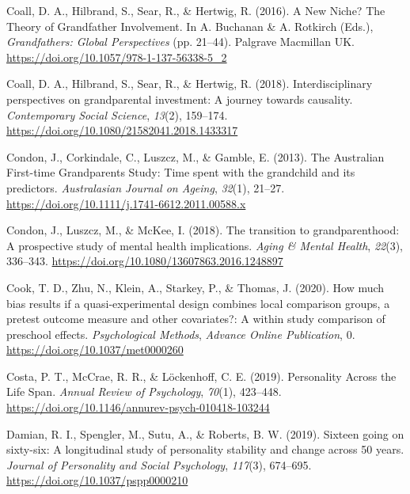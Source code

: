 \documentclass[
  english,
  man, noextraspace]{apa7}
\begin{document}
\leavevmode\hypertarget{ref-coallNewNicheTheory2016}{}%
Coall, D. A., Hilbrand, S., Sear, R., \& Hertwig, R. (2016). A New Niche? The Theory of Grandfather Involvement. In A. Buchanan \& A. Rotkirch (Eds.), \emph{Grandfathers: Global Perspectives} (pp. 21--44). Palgrave Macmillan UK. \url{https://doi.org/10.1057/978-1-137-56338-5_2}

\leavevmode\hypertarget{ref-coallInterdisciplinaryPerspectivesGrandparental2018}{}%
Coall, D. A., Hilbrand, S., Sear, R., \& Hertwig, R. (2018). Interdisciplinary perspectives on grandparental investment: A journey towards causality. \emph{Contemporary Social Science}, \emph{13}(2), 159--174. \url{https://doi.org/10.1080/21582041.2018.1433317}

\leavevmode\hypertarget{ref-condonAustralianFirsttimeGrandparents2013}{}%
Condon, J., Corkindale, C., Luszcz, M., \& Gamble, E. (2013). The Australian First-time Grandparents Study: Time spent with the grandchild and its predictors. \emph{Australasian Journal on Ageing}, \emph{32}(1), 21--27. \url{https://doi.org/10.1111/j.1741-6612.2011.00588.x}

\leavevmode\hypertarget{ref-condonTransitionGrandparenthoodProspective2018}{}%
Condon, J., Luszcz, M., \& McKee, I. (2018). The transition to grandparenthood: A prospective study of mental health implications. \emph{Aging \& Mental Health}, \emph{22}(3), 336--343. \url{https://doi.org/10.1080/13607863.2016.1248897}

\leavevmode\hypertarget{ref-cookHowMuchBias2020}{}%
Cook, T. D., Zhu, N., Klein, A., Starkey, P., \& Thomas, J. (2020). How much bias results if a quasi-experimental design combines local comparison groups, a pretest outcome measure and other covariates?: A within study comparison of preschool effects. \emph{Psychological Methods}, \emph{Advance Online Publication}, 0. \url{https://doi.org/10.1037/met0000260}

\leavevmode\hypertarget{ref-costaPersonalityLifeSpan2019}{}%
Costa, P. T., McCrae, R. R., \& Löckenhoff, C. E. (2019). Personality Across the Life Span. \emph{Annual Review of Psychology}, \emph{70}(1), 423--448. \url{https://doi.org/10.1146/annurev-psych-010418-103244}

\leavevmode\hypertarget{ref-damianSixteenGoingSixtysix2019}{}%
Damian, R. I., Spengler, M., Sutu, A., \& Roberts, B. W. (2019). Sixteen going on sixty-six: A longitudinal study of personality stability and change across 50 years. \emph{Journal of Personality and Social Psychology}, \emph{117}(3), 674--695. \url{https://doi.org/10.1037/pspp0000210}
\end{document}
